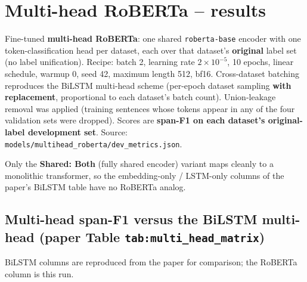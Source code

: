 \section*{Multi-head RoBERTa -- results}

Fine-tuned \textbf{multi-head RoBERTa}: one shared \texttt{roberta-base} encoder with one token-classification head per dataset, each over that dataset's \textbf{original} label set (no label unification). Recipe: batch 2, learning rate $2\times10^{-5}$, 10 epochs, linear schedule, warmup 0, seed 42, maximum length 512, bf16. Cross-dataset batching reproduces the BiLSTM multi-head scheme (per-epoch dataset sampling \textbf{with replacement}, proportional to each dataset's batch count). Union-leakage removal was applied (training sentences whose tokens appear in any of the four validation sets were dropped). Scores are \textbf{span-F1 on each dataset's original-label development set}. Source: \texttt{models/multihead\_roberta/dev\_metrics.json}.

Only the \textbf{Shared: Both} (fully shared encoder) variant maps cleanly to a monolithic transformer, so the embedding-only / LSTM-only columns of the paper's BiLSTM table have no RoBERTa analog.

\subsection*{Multi-head span-F1 versus the BiLSTM multi-head (paper Table \texttt{tab:multi\_head\_matrix})}

BiLSTM columns are reproduced from the paper for comparison; the RoBERTa column is this run.

\begin{table}[h!]
\centering
{}%
\caption{Multi-head span-F1 for BiLSTM and RoBERTa models on each dataset.}
\label{tab:multi_head_matrix}
\end{table}

